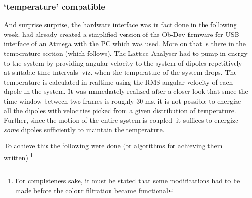		\subsubsection{`temperature' compatible}
			\par
			And surprise surprise, the hardware interface was in fact done in the following week. \myProf had already created a simplified version of the Ob-Dev firmware for USB interface of an Atmega with the PC which was used. More on that is there in the temperature section (which follows). The Lattice Analyser had to pump in energy to the system by providing angular velocity to the system of dipoles repetitively at suitable time intervals, viz. when the temperature of the system drops. The temperature is calculated in realtime using the RMS angular velocity of each dipole in the system. It was immediately realized after a closer look that since the time window between two frames is roughly 30 ms, it is not possible to energize all the dipoles with velocities picked from a given distribution of temperature. Further, since the motion of the entire system is coupled, it suffices to energize \emph{some} dipoles sufficiently to maintain the temperature.
			\par
			To achieve this the following were done (or algorithms for achieving them written) \footnote{For completeness sake, it must be stated that some modifications had to be made before the colour filtration became functional}
